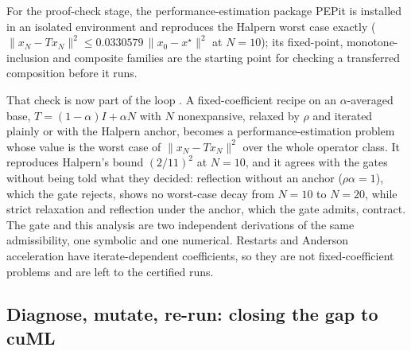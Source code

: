 For the proof-check stage, the performance-estimation package PEPit is
installed in an isolated environment and reproduces the Halpern worst case
exactly ($\|x_N - T x_N\|^2 \le 0.0330579\,\|x_0 - x^\star\|^2$ at $N = 10$); its
fixed-point, monotone-inclusion and composite families are the starting point
for checking a transferred composition before it runs.

That check is now part of the loop .
A fixed-coefficient recipe on an $\alpha$-averaged base, $T = (1-\alpha)I + \alpha N$
with $N$ nonexpansive, relaxed by $\rho$ and iterated plainly or with the
Halpern anchor, becomes a performance-estimation problem whose value is the
worst case of $\|x_N - T x_N\|^2$ over the whole operator class. It reproduces
Halpern's bound $(2/11)^2$ at $N=10$, and it agrees with the gates without being
told what they decided: reflection without an anchor ($\rho\alpha = 1$), which the
gate rejects, shows no worst-case decay from $N=10$ to $N=20$, while strict
relaxation and reflection under the anchor, which the gate admits, contract.
The gate and this analysis are two independent derivations of the same
admissibility, one symbolic and one numerical. Restarts and Anderson
acceleration have iterate-dependent coefficients, so they are not
fixed-coefficient problems and are left to the certified runs.

\subsection{Diagnose, mutate, re-run: closing the gap to cuML}
\label{app:log:diagnose}

